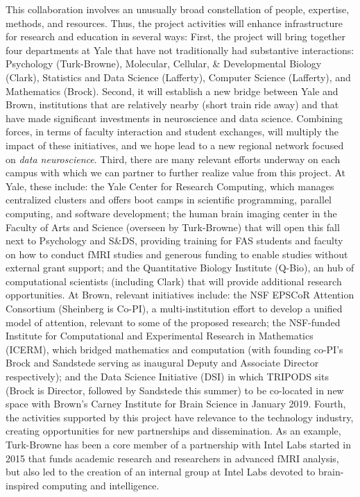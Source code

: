This collaboration involves an unusually broad constellation of people,
expertise, methods, and resources. Thus, the project activities will
enhance infrastructure for research and education in several ways:
First, the project will bring together four departments at Yale that
have not traditionally had substantive interactions: Psychology
(Turk-Browne), Molecular, Cellular, \& Developmental Biology (Clark),
Statistics and Data Science (Lafferty), Computer Science (Lafferty), and Mathematics (Brock). 
Second, it will establish a
new bridge between Yale and Brown, institutions that are relatively
nearby (short train ride away) and that have made significant
investments in neuroscience and data science. Combining forces, in terms
of faculty interaction and student exchanges, will multiply the impact
of these initiatives, and we hope lead to a new regional network focused on
\emph{data neuroscience}. Third, there are many relevant efforts underway on
each campus with which we can partner to further realize value from this
project. At Yale, these include: the Yale Center for Research Computing,
which manages centralized clusters and offers boot camps in scientific
programming, parallel computing, and software development; the human
brain imaging center in the Faculty of Arts and Science (overseen by
Turk-Browne) that will open this fall next to Psychology and S\&DS,
providing training for FAS students and faculty on how to conduct fMRI
studies and generous funding to enable studies without external grant
support; and the Quantitative Biology Institute (Q-Bio), an hub of
computational scientists (including Clark) that will provide additional
research opportunities. At Brown, relevant initiatives include: the NSF
EPSCoR Attention Consortium (Sheinberg is Co-PI), a multi-institution
effort to develop a unified model of attention, relevant to some of the
proposed research; the NSF-funded Institute for Computational and
Experimental Research in Mathematics (ICERM), which bridged mathematics
and computation (with founding co-PI's Brock and Sandstede serving as inaugural Deputy and Associate Director respectively);
and the Data Science Initiative (DSI) in which TRIPODS sits (Brock is
Director, followed by Sandstede this summer) to be co-located in new space with Brown's Carney Institute for Brain Science in January 2019. Fourth, the activities supported by
this project have relevance to the technology industry, creating
opportunities for new partnerships and dissemination. As an example,
Turk-Browne has been a core member of a partnership with Intel Labs
started in 2015 that funds academic research and researchers in advanced
fMRI analysis, but also led to the creation of an internal group at
Intel Labs devoted to brain-inspired computing and intelligence.

